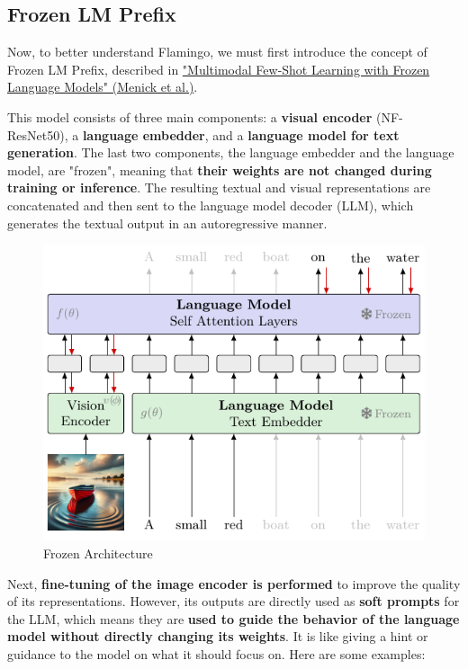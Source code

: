 \subsection{Frozen LM Prefix}

Now, to better understand Flamingo, we must first introduce the concept of Frozen LM Prefix, described in \href{https://arxiv.org/pdf/2106.13884}{"Multimodal Few-Shot Learning with Frozen Language Models" (Menick et al.)}. 

This model consists of three main components: a \textbf{visual encoder} (NF-ResNet50), a \textbf{language embedder}, and a \textbf{language model for text generation}. The last two components, the language embedder and the language model, are "frozen", meaning that \textbf{their weights are not changed during training or inference}. The resulting textual and visual representations are concatenated and then sent to the language model decoder (LLM), which generates the textual output in an autoregressive manner.

\begin{figure}[!htbp]
    \centering
    \includegraphics[width=0.7\linewidth]{tikz/chapter11 - Frozen LM.pdf}
    \caption{Frozen Architecture}
\end{figure}

\newpage
Next, \textbf{fine-tuning of the image encoder is performed} to improve the quality of its representations. However, its outputs are directly used as \textbf{soft prompts} for the LLM, which means they are \textbf{used to guide the behavior of the language model without directly changing its weights}. It is like giving a hint or guidance to the model on what it should focus on. Here are some examples:

